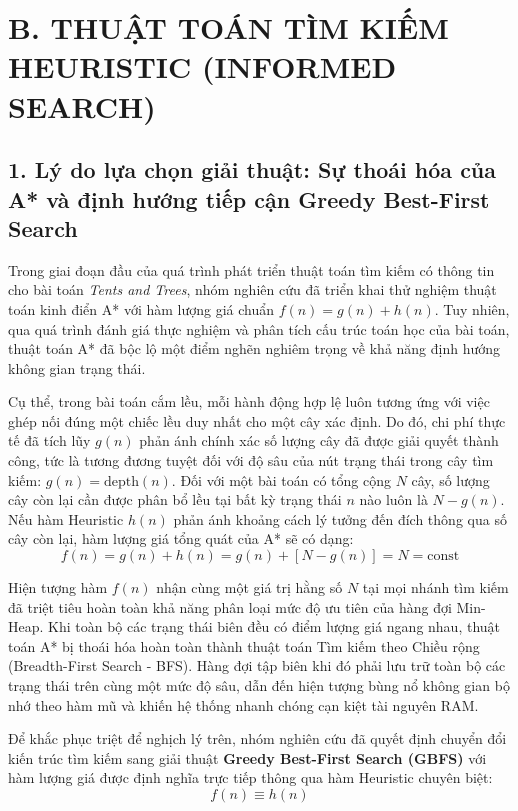 \documentclass[a4paper,12pt]{article}
\begin{document}
\section*{B. THUẬT TOÁN TÌM KIẾM HEURISTIC (INFORMED SEARCH)}

\subsection*{1. Lý do lựa chọn giải thuật: Sự thoái hóa của A* và định hướng tiếp cận Greedy Best-First Search}

Trong giai đoạn đầu của quá trình phát triển thuật toán tìm kiếm có thông tin cho bài toán \textit{Tents and Trees}, nhóm nghiên cứu đã triển khai thử nghiệm thuật toán kinh điển A* với hàm lượng giá chuẩn $f(n) = g(n) + h(n)$. Tuy nhiên, qua quá trình đánh giá thực nghiệm và phân tích cấu trúc toán học của bài toán, thuật toán A* đã bộc lộ một điểm nghẽn nghiêm trọng về khả năng định hướng không gian trạng thái.

Cụ thể, trong bài toán cắm lều, mỗi hành động hợp lệ luôn tương ứng với việc ghép nối đúng một chiếc lều duy nhất cho một cây xác định. Do đó, chi phí thực tế đã tích lũy $g(n)$ phản ánh chính xác số lượng cây đã được giải quyết thành công, tức là tương đương tuyệt đối với độ sâu của nút trạng thái trong cây tìm kiếm: $g(n) = \text{depth}(n)$. Đối với một bài toán có tổng cộng $N$ cây, số lượng cây còn lại cần được phân bổ lều tại bất kỳ trạng thái $n$ nào luôn là $N - g(n)$. Nếu hàm Heuristic $h(n)$ phản ánh khoảng cách lý tưởng đến đích thông qua số cây còn lại, hàm lượng giá tổng quát của A* sẽ có dạng:
\begin{equation}
    f(n) = g(n) + h(n) = g(n) + [N - g(n)] = N = \text{const}
\end{equation}

Hiện tượng hàm $f(n)$ nhận cùng một giá trị hằng số $N$ tại mọi nhánh tìm kiếm đã triệt tiêu hoàn toàn khả năng phân loại mức độ ưu tiên của hàng đợi Min-Heap. Khi toàn bộ các trạng thái biên đều có điểm lượng giá ngang nhau, thuật toán A* bị thoái hóa hoàn toàn thành thuật toán Tìm kiếm theo Chiều rộng (Breadth-First Search - BFS). Hàng đợi tập biên khi đó phải lưu trữ toàn bộ các trạng thái trên cùng một mức độ sâu, dẫn đến hiện tượng bùng nổ không gian bộ nhớ theo hàm mũ và khiến hệ thống nhanh chóng cạn kiệt tài nguyên RAM.

Để khắc phục triệt để nghịch lý trên, nhóm nghiên cứu đã quyết định chuyển đổi kiến trúc tìm kiếm sang giải thuật \textbf{Greedy Best-First Search (GBFS)} với hàm lượng giá được định nghĩa trực tiếp thông qua hàm Heuristic chuyên biệt:
\begin{equation}
    f(n) \equiv h(n)
\end{equation}
\end{document}
